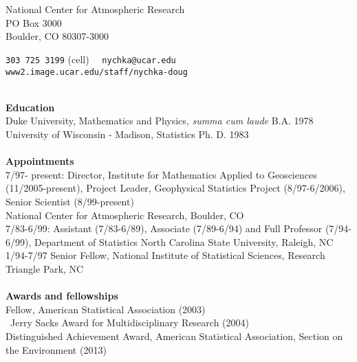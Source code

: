 \documentclass[10pt]{article}
\begin{document}
 
  
\vspace*{-1in}
 \\ \\  
\thispagestyle{empty}
\begin{minipage}[t]{3in}
\vspace*{0in}
National Center for Atmospheric Research  \\
PO Box 3000 \\  Boulder, CO 80307-3000 \\ 
\end{minipage}
\begin{minipage}[t]{3in}
\vspace*{0in}
  {\tt 303 725 3199} (cell)  \  \  {\tt nychka@ucar.edu}  \\    
\verb+www2.image.ucar.edu/staff/nychka-doug+ 
\end{minipage}
%
%
 \\
{\large \bf Education} \\
 Duke University, Mathematics and Physics, {\it summa cum laude} B.A. 1978  \\
 University of Wisconsin - Madison,   Statistics  Ph. D. 1983
\\  \\ {\large \bf Appointments} \\
7/97- present:  Director, Institute for Mathematics Applied to Geosciences (11/2005-present),
  Project Leader, Geophysical 
Statistics Project (8/97-6/2006), Senior Scientist (8/99-present) \\
National Center for Atmospheric Research, Boulder, CO
\\[.05in]
7/83-6/99:   Assistant (7/83-6/89),
Associate
(7/89-6/94) and Full Professor (7/94-6/99), Department of
Statistics
 North Carolina State University, Raleigh, NC 
\\[.05in]
1/94-7/97
Senior Fellow, National Institute of Statistical Sciences, Research
Triangle Park, NC
%
%
\\ \\  { \large \bf Awards and fellowships}  \\
 Fellow, American Statistical Association   (2003) \\ \
 Jerry Sacks Award for Multidisciplinary Research  (2004)\\
    Distinguished Achievement Award, 
 American Statistical Association, Section on the Environment  (2013) \\
\end{document}
